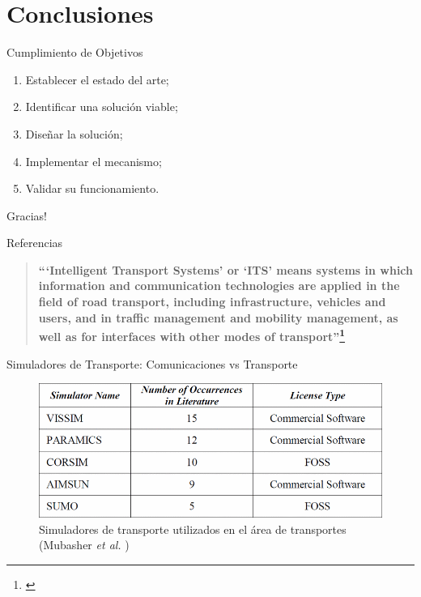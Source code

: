 \documentclass[aspectratio=169]{beamer}
\begin{document}
\section{Conclusiones}
\begin{frame}{Cumplimiento de Objetivos}
\centering
\begin{minipage}{.8\textwidth}
    \begin{enumerate}\pause
        \item Establecer el estado del arte;\hfill\checkmark\pause
        \item Identificar una solución viable;\hfill\checkmark\pause
        \item Diseñar la solución;\hfill\checkmark\pause
        \item Implementar el mecanismo;\hfill\checkmark\pause
        \item Validar su funcionamiento.\hfill\checkmark
    \end{enumerate}%
\end{minipage}
\end{frame}

\begin{frame}[standout]
Gracias!
\end{frame}

\begin{frame}[c,allowframebreaks]{Referencias}
\printbibliography[heading=none]
\end{frame}

\begin{frame}%
\begin{quote}
    \centering
    \textbf{``‘Intelligent Transport Systems’ or ‘ITS’ means systems in which information and communication technologies are applied in the field of road transport, including infrastructure, vehicles and users, and in traffic management and mobility management, as well as for interfaces with other modes of transport''\footnote{\textcite{eudirective}}}
\end{quote}
\end{frame}

\begin{frame}{Simuladores de Transporte: Comunicaciones vs Transporte}
\begin{figure}[p]
    \centering
    \includegraphics[width=.8\linewidth]{figuras/popular_trafficsims.png}
    \caption{Simuladores de transporte utilizados en el área de transportes\\(Mubasher \emph{et al.} \autocite{traffic_sim_review})}
\end{figure}
\end{frame}
\end{document}
